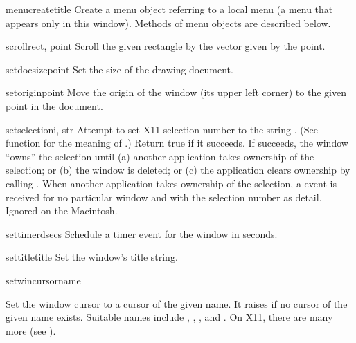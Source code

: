 \begin{methoddesc}[window]{menucreate}{title}
Create a menu object referring to a local menu (a menu that appears
only in this window).
Methods of menu objects are described below.
\end{methoddesc}

\begin{methoddesc}[window]{scroll}{rect, point}
Scroll the given rectangle by the vector given by the point.
\end{methoddesc}

\begin{methoddesc}[window]{setdocsize}{point}
Set the size of the drawing document.
\end{methoddesc}

\begin{methoddesc}[window]{setorigin}{point}
Move the origin of the window (its upper left corner)
to the given point in the document.
\end{methoddesc}

\begin{methoddesc}[window]{setselection}{i, str}
Attempt to set X11 selection number  to the string .
(See  function  for the
meaning of .)  Return true if it succeeds.
If  succeeds, the window ``owns'' the selection until
(a) another application takes ownership of the selection; or
(b) the window is deleted; or
(c) the application clears ownership by calling
.  When another application
takes ownership of the selection, a  event is
received for no particular window and with the selection number as
detail.  Ignored on the Macintosh.
\end{methoddesc}

\begin{methoddesc}[window]{settimer}{dsecs}
Schedule a timer event for the window in 
seconds.
\end{methoddesc}

\begin{methoddesc}[window]{settitle}{title}
Set the window's title string.
\end{methoddesc}

\begin{methoddesc}[window]{setwincursor}{name}
\begin{sloppypar}
Set the window cursor to a cursor of the given name.  It raises
 if no cursor of the given name exists.
Suitable names include
,
,
,
and
.
On X11, there are many more (see ).
\end{sloppypar}
\end{methoddesc}

